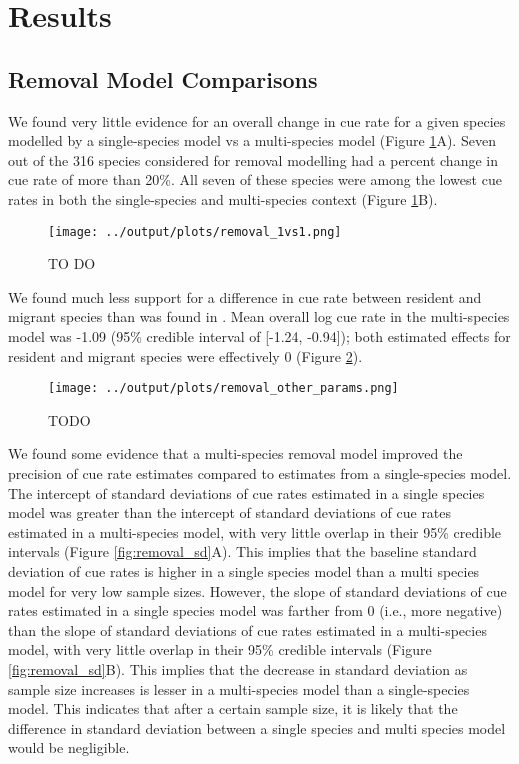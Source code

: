 \documentclass[12pt]{article}
\begin{document}
\section{Results}
\subsection{Removal Model Comparisons}

\par We found very little evidence for an overall change in cue rate for a given species modelled by a single-species model vs a multi-species model (Figure \ref{fig:removal_1vs1}A).
Seven out of the 316 species considered for removal modelling had a percent change in cue rate of more than 20\%.
All seven of these species were among the lowest cue rates in both the single-species and multi-species context (Figure \ref{fig:removal_1vs1}B).

\begin{figure}[h!]
	\texttt{[image: ../output/plots/removal\_1vs1.png]}
	\caption{TO DO}
	\label{fig:removal_1vs1}
\end{figure}


\par We found much less support for a difference in cue rate between resident and migrant species than was found in \citet{solymos_evaluating_2018}. 
Mean overall log cue rate in the multi-species model was -1.09 (95\% credible interval of [-1.24, -0.94]); both estimated effects for resident and migrant species were effectively 0 (Figure \ref{fig:removal_params}).

\begin{figure}[h!]
	\texttt{[image: ../output/plots/removal\_other\_params.png]}
	\caption{TODO}
	\label{fig:removal_params}
\end{figure}

\par We found some evidence that a multi-species removal model improved the precision of cue rate estimates compared to estimates from a single-species model.
The intercept of standard deviations of cue rates estimated in a single species model was greater than the intercept of standard deviations of cue rates estimated in a multi-species model, with very little overlap in their 95\% credible intervals (Figure \ref{fig:removal_sd}A).
This implies that the baseline standard deviation of cue rates is higher in a single species model than a multi species model for very low sample sizes.
However, the slope of standard deviations of cue rates estimated in a single species model was farther from 0 (i.e., more negative) than the slope of standard deviations of cue rates estimated in a multi-species model, with very little overlap in their 95\% credible intervals (Figure \ref{fig:removal_sd}B).
This implies that the decrease in standard deviation as sample size increases is lesser in a multi-species model than a single-species model.
This indicates that after a certain sample size, it is likely that the difference in standard deviation between a single species and multi species model would be negligible.
\end{document}
